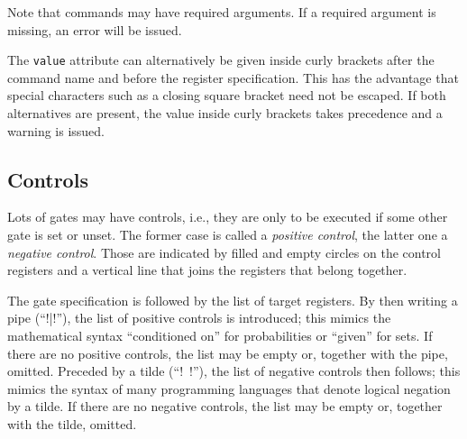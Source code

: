 \documentclass{scrartcl}
\begin{document}
         Note that commands may have required arguments.
         If a required argument is missing, an error will be issued.

         The \texttt{value} attribute can alternatively be given inside curly brackets after the command name and before the register specification.
         This has the advantage that special characters such as a closing square bracket need not be escaped.
         If both alternatives are present, the value inside curly brackets takes precedence and a warning is issued.

      \subsection{Controls}
         Lots of gates may have controls, i.e., they are only to be executed if some other gate is set or unset.
         The former case is called a \emph{positive control}, the latter one a \emph{negative control}.
         Those are indicated by filled and empty circles on the control registers and a vertical line that joins the registers that belong together.

         The gate specification is followed by the list of target registers.
         By then writing a pipe (``\yquant!|!''), the list of positive controls is introduced; this mimics the mathematical syntax ``conditioned on'' for probabilities or ``given'' for sets.
         If there are no positive controls, the list may be empty or, together with the pipe, omitted.
         Preceded by a tilde (``\yquant!~!''), the list of negative controls then follows; this mimics the syntax of many programming languages that denote logical negation by a tilde.
         If there are no negative controls, the list may be empty or, together with the tilde, omitted.
\end{document}
